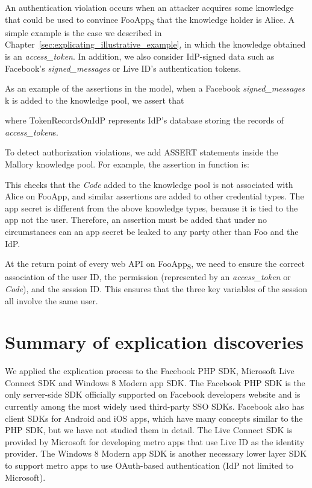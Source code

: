  An authentication violation occurs when an attacker acquires some knowledge that could be used to convince FooApp\textsubscript{S} that the knowledge holder is Alice.  A simple example is the case we described in Chapter~\ref{sec:explicating_illustrative_example}, in which the knowledge obtained is an \emph{access\_token}.  In addition, we also consider IdP-signed data such as Facebook's \emph{signed\_messages} or Live ID's authentication tokens.  

As an example of the assertions in the model, when a Facebook \emph{signed\_messages} k is added to the knowledge pool, we assert that


where TokenRecordsOnIdP represents IdP's database storing the records of \emph{access\_token}s.

 To detect authorization violations, we add ASSERT statements inside the Mallory knowledge pool.  For example, the assertion in function  is:


This checks that the \emph{Code} added to the knowledge pool is not associated with Alice on FooApp, and similar assertions are added to other credential types.  The app secret is different from the above knowledge types, because it is tied to the app not the user.  Therefore, an assertion must be added that under no circumstances can an app secret be leaked to any party other than Foo and the IdP.

 At the return point of every web API on FooApp\textsubscript{S}, we need to ensure the correct association of the user ID, the permission (represented by an \emph{access\_token} or \emph{Code}), and the session ID.  This ensures that the three key variables of the session all involve the same user.

\section{Summary of explication discoveries}
\label{sec:explicating_discoveries}

We applied the explication process to the Facebook PHP SDK, Microsoft Live Connect SDK and Windows 8 Modern app SDK.  The Facebook PHP SDK is the only server-side SDK officially supported on Facebook developers website and is currently among the most widely used third-party SSO SDKs.  Facebook also has client SDKs for Android and iOS apps, which have many concepts similar to the PHP SDK, but we have not studied them in detail.  The Live Connect SDK is provided by Microsoft for developing metro apps that use Live ID as the identity provider.  The Windows 8 Modern app SDK is another necessary lower layer SDK to support metro apps to use OAuth-based authentication (IdP not limited to Microsoft).  


